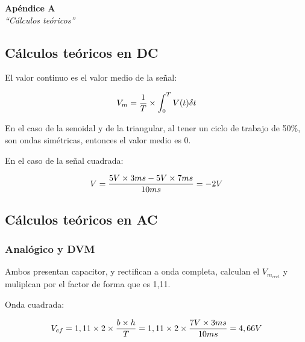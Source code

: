 \documentclass{article}
\begin{document}

\newpage
\vspace*{4cm}
\begin{center}
	\textbf{\Huge{Apéndice A}} \\
	\bigskip\bigskip
	\Large{\textit{``Cálculos teóricos''}}
\end{center}


\newpage
\subsection{Cálculos teóricos en DC}

El valor continuo es el valor medio de la señal:

\begin{center}
\begin{equation}
V_{m} =  {{1}\over{T}} \times \int_{0}^{T} {V(t)} \delta t
\end{equation}
\end{center}
\bigskip

En el caso de la senoidal y de la triangular, al tener un ciclo de trabajo de 50\%, son ondas simétricas, entonces el valor medio es 0.

En el caso de la señal cuadrada:

\begin{center}
\begin{equation}
V =  {5V \times 3ms - 5V \times 7ms \over 10ms }= -2V
\end{equation}
\end{center}
\bigskip

\subsection{Cálculos teóricos en AC}

\subsubsection{Analógico y DVM}

Ambos presentan capacitor, y rectifican a onda completa, calculan el $V_{m_{rect}}$ y muliplcan por el factor de forma que es 1,11.

Onda cuadrada:

\begin{center}
\begin{equation}
V_{ef} = 1,11 \times 2 \times {b \times h \over T} = 1,11 \times 2 \times {7V \times 3ms \over 10ms} = 4,66V
\end{equation}
\end{center}
\medskip
\end{document}
